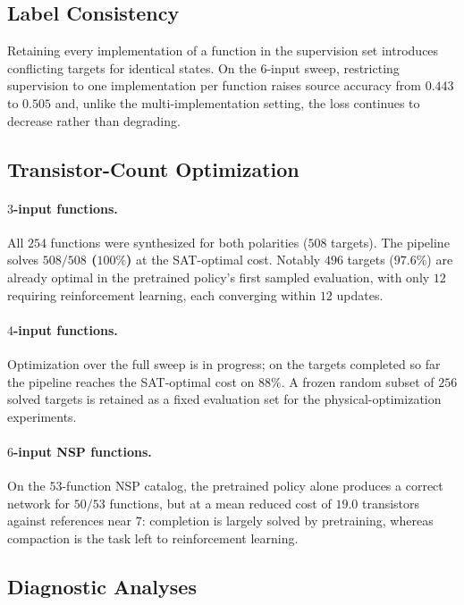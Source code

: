 \documentclass[11pt, a4paper]{article}
\theoremstyle{plain}
\theoremstyle{definition}
\theoremstyle{remark}
\begin{document}
\subsection{Label Consistency}

Retaining every implementation of a function in the supervision set
introduces conflicting targets for identical states.  On the $6$-input
sweep, restricting supervision to one implementation per function raises
source accuracy from $0.443$ to $0.505$ and, unlike the multi-implementation
setting, the loss continues to decrease rather than degrading.

\subsection{Transistor-Count Optimization}

\paragraph{$3$-input functions.}
All $254$ functions were synthesized for both polarities ($508$ targets).
The pipeline solves \textbf{$508/508$ ($100\%$)} at the SAT-optimal cost.
Notably $496$ targets ($97.6\%$) are already optimal in the pretrained
policy's first sampled evaluation, with only $12$ requiring
reinforcement learning, each converging within $12$ updates.

\paragraph{$4$-input functions.}
Optimization over the full sweep is in progress; on the targets completed
so far the pipeline reaches the SAT-optimal cost on $88\%$.  A frozen
random subset of $256$ solved targets is retained as a fixed evaluation
set for the physical-optimization experiments.

\paragraph{$6$-input NSP functions.}
On the $53$-function NSP catalog, the pretrained policy alone produces a
correct network for $50/53$ functions, but at a mean reduced cost of
$19.0$ transistors against references near $7$: completion is largely
solved by pretraining, whereas compaction is the task left to
reinforcement learning.

\subsection{Diagnostic Analyses}
\end{document}
